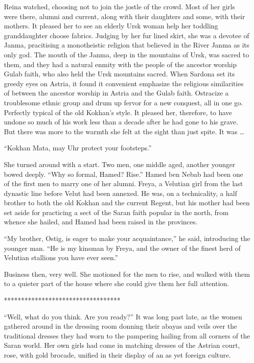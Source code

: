 \documentclass{article}
\begin{document}
	Reina watched, choosing not to join the jostle of the crowd. Most of her girls were there, alumni and current, along with their daughters and some, with their mothers. It pleased her to see an elderly Ursk woman help her toddling granddaughter choose fabrics. Judging by her fur lined skirt, she was a devotee of Janma, pracitising a monotheistic religion that believed in the River Janma as its only god. The mouth of the Janma, deep in the mountains of Ursk, was sacred to them, and they had a natural enmity with the people of the ancestor worship Gulab faith, who also held the Ursk mountains sacred. When Sardona set its greedy eyes on Astria, it found it convenient emphasize the religious similarities of between the ancestor worship in Astria and the Gulab faith. Ostracize a troublesome ethnic group and drum up fervor for a new conquest, all in one go. Perfectly typical of the old Kokhan’s style. It pleased her, therefore, to have undone so much of his work less than a decade after he had gone to his grave. But there was more to the warmth she felt at the sight than just spite. It was …
	
	“Kokhan Mata, may Uhr protect your footsteps.” 
	
	She turned around with a start. Two men, one middle aged, another younger bowed deeply. “Why so formal, Hamed? Rise.” Hamed ben Nebab had been one of the first men to marry one of her alumni. Freya, a Velutian girl from the last dynastic line before Velut had been annexed. He was, on a technicality, a half brother to both the old Kokhan and the current Regent, but his mother had been set aside for practicing a sect of the Saran faith popular in the north, from whence she hailed, and Hamed had been raised in the provinces.
	
	“My brother, Ostig, is eager to make your acquaintance,” he said, introducing the younger man. “He is my kinsman by Freya, and the owner of the finest herd of Velutian stallions you have ever seen.” 
	
	Business then, very well. She motioned for the men to rise, and walked with them to a quieter part of the house where she could give them her full attention.
	
	**********************************
	
	“Well, what do you think. Are you ready?” It was long past late, as the women gathered around  in the dressing room donning their abayas and veils over the traditional dresses they had worn to the pampering hailing from all corners of the Saran world. Her own girls had come in matching dresses of the Astrian court, rose, with gold brocade, unified in their display of an as yet foreign culture.
	
\end{document}
